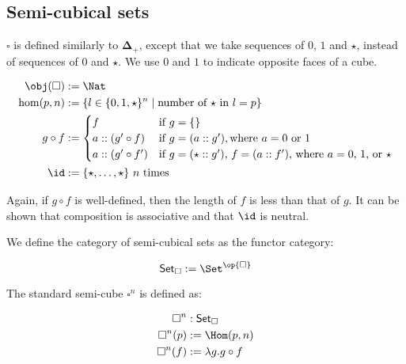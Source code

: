 \documentclass[10pt]{art.cls/art}
\newcommand{\DeltaPlus}{\ensuremath{\boldsymbol{\Delta}_+}}
\newcommand{\Cube}{\ensuremath{\boldsymbol{\square}}}
\newcommand{\CSet}{\ensuremath{\mathsf{Set}_{\boldsymbol{\square}}}}
\newcommand{\kstar}{{\star}}
\begin{document}
\subsection{Semi-cubical sets}
\begin{definition}[\Cube]
  $\Cube$ is defined similarly to $\DeltaPlus$, except that we take sequences of $0$, $1$ and $\star$, instead of sequences of $0$ and $\kstar$. We use $0$ and $1$ to indicate opposite faces of a cube.

  \begin{align*}
    \obj(\Cube) & := \Nat                                                                                \\
    \hom(p, n)  & := \{l \in \{0, 1, \kstar\}^n \mid \text{number of $\kstar$ in $l = p$}\}              \\
    g \circ f   & :=
    \begin{cases}
      f                  & \text{if $g = \{\}$}                                                            \\
      a :: (g' \circ f)  & \text{if $g = (a :: g')$}, \text{where $a = 0$ or $1$}                          \\
      a :: (g' \circ f') & \text{if $g = (\star :: g')$, $f = (a :: f')$, where $a = 0$, $1$, or $\kstar$} \\
    \end{cases} \\
    \id         & := \{\kstar, \ldots, \kstar\} \text{ $n$ times}
  \end{align*}

  Again, if $g \circ f$ is well-defined, then the length of $f$ is less than that of $g$. It can be shown that composition is associative and that $\id$ is neutral.
\end{definition}

\begin{definition}[\CSet]
  We define the category of semi-cubical sets as the functor category:

  \begin{equation*}
    \CSet := \Set^{\op{\Cube}}
  \end{equation*}
\end{definition}

\begin{definition}[$\Cube^n$]
  The standard semi-cube $\Cube^n$ is defined as:

  \begin{align*}
    \Cube^n    & : \CSet                  \\
    \Cube^n(p) & := \Hom(p, n)            \\
    \Cube^n(f) & := \lambda g . g \circ f
  \end{align*}
\end{definition}
\end{document}
